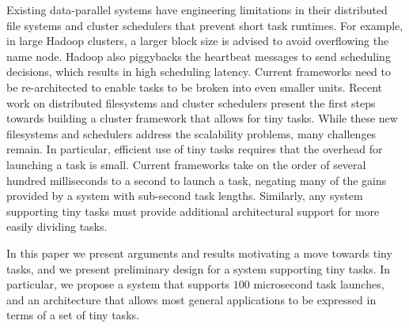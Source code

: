 Existing data-parallel systems have engineering limitations in their distributed
file systems and cluster schedulers that prevent short task runtimes. For example, in
large Hadoop clusters, a larger block size is advised to avoid overflowing the name node.
Hadoop also piggybacks the heartbeat messages to send scheduling decisions, which
results in high scheduling latency.
Current frameworks need to be re-architected to enable tasks to be broken into even smaller
units.
Recent work on distributed filesystems\cite{nightingale2012flat} and cluster
schedulers\cite{ousterhoutbatch} present the first steps towards
building a cluster framework that allows for tiny tasks. While these new filesystems
and schedulers address the scalability problems, many challenges remain. In particular,
efficient use of tiny tasks requires that the overhead for launching a task is small. Current
frameworks take on the order of several hundred milliseconds to a second to launch a task, negating
many of the gains provided by a system with sub-second task lengths. Similarly, any system
supporting tiny tasks must provide additional architectural support for more easily dividing tasks.

In this paper we present arguments and results motivating a move towards tiny tasks,
and we present preliminary design for a system supporting tiny tasks. In particular,
we propose a system that supports $100$ microsecond task launches, and an architecture
that allows most general applications to be expressed in terms of a set of tiny tasks.

